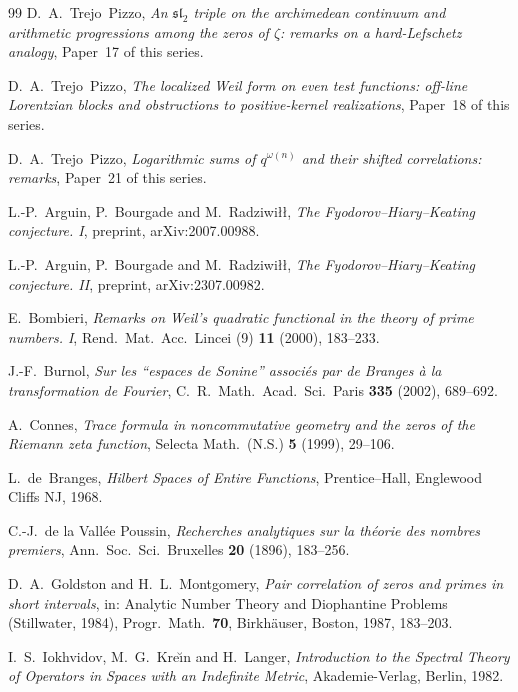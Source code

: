 \documentclass[11pt]{amsart}
\theoremstyle{definition}
\theoremstyle{remark}
\begin{document}
\begin{thebibliography}{99}
D.~A.\ Trejo~Pizzo,
\emph{An $\mathfrak{sl}_2$ triple on the archimedean continuum and arithmetic progressions among the zeros of $\zeta$: remarks on a hard-Lefschetz analogy},
Paper~17 of this series.

D.~A.\ Trejo~Pizzo,
\emph{The localized Weil form on even test functions: off-line Lorentzian blocks and obstructions to positive-kernel realizations},
Paper~18 of this series.

D.~A.\ Trejo~Pizzo,
\emph{Logarithmic sums of $q^{\omega(n)}$ and their shifted correlations: remarks},
Paper~21 of this series.


L.-P.\ Arguin, P.\ Bourgade and M.\ Radziwi{\l}{\l},
\emph{The Fyodorov--Hiary--Keating conjecture. I},
preprint, arXiv:2007.00988.

L.-P.\ Arguin, P.\ Bourgade and M.\ Radziwi{\l}{\l},
\emph{The Fyodorov--Hiary--Keating conjecture. II},
preprint, arXiv:2307.00982.

E.\ Bombieri,
\emph{Remarks on Weil's quadratic functional in the theory of prime numbers. I},
Rend.\ Mat.\ Acc.\ Lincei (9) \textbf{11} (2000), 183--233.

J.-F.\ Burnol,
\emph{Sur les ``espaces de Sonine'' associ\'es par de Branges \`a la transformation de Fourier},
C.~R.\ Math.\ Acad.\ Sci.\ Paris \textbf{335} (2002), 689--692.

A.\ Connes,
\emph{Trace formula in noncommutative geometry and the zeros of the Riemann zeta function},
Selecta Math.\ (N.S.) \textbf{5} (1999), 29--106.

L.~de~Branges,
\emph{Hilbert Spaces of Entire Functions},
Prentice--Hall, Englewood Cliffs NJ, 1968.

C.-J.\ de la Vall\'ee Poussin,
\emph{Recherches analytiques sur la th\'eorie des nombres premiers},
Ann.\ Soc.\ Sci.\ Bruxelles \textbf{20} (1896), 183--256.

D.~A.\ Goldston and H.~L.\ Montgomery,
\emph{Pair correlation of zeros and primes in short intervals},
in: Analytic Number Theory and Diophantine Problems (Stillwater, 1984),
Progr.\ Math.\ \textbf{70}, Birkh\"auser, Boston, 1987, 183--203.

I.~S.\ Iokhvidov, M.~G.\ Kre\u\i n and H.\ Langer,
\emph{Introduction to the Spectral Theory of Operators in Spaces with an Indefinite Metric},
Akademie-Verlag, Berlin, 1982.


\end{thebibliography}
\end{document}
